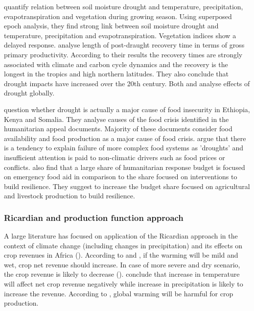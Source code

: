 \documentclass[a4paper,12pt]{article}
\begin{document}
 \cite{nicolai2017} quantify relation between soil moisture drought and temperature, precipitation, evapotranspiration and vegetation during growing season. Using superposed epoch analysis, they find strong link between soil moisture drought and temperature, precipitation and evapotranspiration. Vegetation indices show a delayed response. \cite{schwalm2017} analyse length of post-draught recovery time in terms of gross primary productivity. According to their results the recovery times are strongly associated with climate and carbon cycle dynamics and the recovery is the longest in the tropics and high northern latitudes. They also conclude that drought impacts have increased over the 20th century. Both \cite{nicolai2017} and \cite{schwalm2017} analyse effects of drought globally.
 
 \cite{Sandstorm2017} question whether drought is actually a major cause of food insecurity in Ethiopia, Kenya and Somalia. They analyse causes of the food crisis identified in the humanitarian appeal documents. Majority of these documents consider food availability and food production as a major cause of food crisis. \cite{Sandstorm2017} argue that there is a tendency to explain failure of more complex food systems as 'droughts' and insufficient attention is paid to non-climatic drivers such as food prices or conflicts.  \cite{Sandstorm2017} also find that a large share of humanitarian response budget is focused on emergency food aid in comparison to the share focused on interventions to build resilience. They suggest to increase the budget share focused on agricultural and livestock production to build resilience. 
 
\subsubsection*{Ricardian and production function approach}

A large literature has focused on application of the Ricardian approach in the context of climate change (including changes in precipitation) and its effects on crop revenues in Africa (\citealp{RicardianBello,kabubo2007, KMendelsohn2008, SeoMendelsohn}). According to \cite{SeoMendelsohn} and \cite{KMendelsohn2008}, if the warming will be mild and wet, crop net revenue should increase. In case of more severe and dry scenario, the crop revenue is likely to decrease (\citealp{KMendelsohn2008, SeoMendelsohn}).  \cite{RicardianBello} conclude that increase in temperature will affect net crop revenue negatively while increase in precipitation is likely to increase the revenue. According to \citet{kabubo2007}, global warming will be harmful for crop production.
\end{document}
